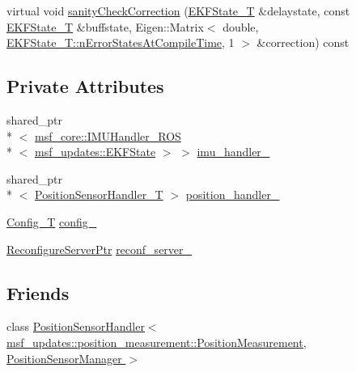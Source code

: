 \begin{DoxyCompactItemize}
\item 
virtual void \hyperlink{classmsf__position__sensor_1_1PositionSensorManager_a93258c3d736a4d38119eba66a4e7dbfa}{sanity\-Check\-Correction} (\hyperlink{classmsf__position__sensor_1_1PositionSensorManager_abf67877833d9fa2ce0afda2fd8f92bae}{E\-K\-F\-State\-\_\-\-T} \&delaystate, const \hyperlink{classmsf__position__sensor_1_1PositionSensorManager_abf67877833d9fa2ce0afda2fd8f92bae}{E\-K\-F\-State\-\_\-\-T} \&buffstate, Eigen\-::\-Matrix$<$ double, \hyperlink{structmsf__core_1_1GenericState__T_a20545d9aacd8f84bc1a97a873310cd5fab0136c5805e4e8d75677885fcaad5901}{E\-K\-F\-State\-\_\-\-T\-::n\-Error\-States\-At\-Compile\-Time}, 1 $>$ \&correction) const 
\end{DoxyCompactItemize}
\subsection*{Private Attributes}
\begin{DoxyCompactItemize}
\item 
shared\-\_\-ptr\\*
$<$ \hyperlink{classmsf__core_1_1IMUHandler__ROS}{msf\-\_\-core\-::\-I\-M\-U\-Handler\-\_\-\-R\-O\-S}\\*
$<$ \hyperlink{namespacemsf__updates_a03b0801c76b7400623b00ad4d28f9bcc}{msf\-\_\-updates\-::\-E\-K\-F\-State} $>$ $>$ \hyperlink{classmsf__position__sensor_1_1PositionSensorManager_a30614404706e5332a0b7d43b7329fa40}{imu\-\_\-handler\-\_\-}
\item 
shared\-\_\-ptr\\*
$<$ \hyperlink{classmsf__position__sensor_1_1PositionSensorManager_afd8d00f9745db7b1b5290f0613ca0eca}{Position\-Sensor\-Handler\-\_\-\-T} $>$ \hyperlink{classmsf__position__sensor_1_1PositionSensorManager_a7611c68c92ee71eef980ae0195894900}{position\-\_\-handler\-\_\-}
\item 
\hyperlink{namespacemsf__position__sensor_a888f7a67abc78bbe9b927b35f1e05933}{Config\-\_\-\-T} \hyperlink{classmsf__position__sensor_1_1PositionSensorManager_ab750ec8335fa617ce51e7e90d1f8e8ad}{config\-\_\-}
\item 
\hyperlink{namespacemsf__position__sensor_a62920eb4890a10e8224aa5ef62bb56a2}{Reconfigure\-Server\-Ptr} \hyperlink{classmsf__position__sensor_1_1PositionSensorManager_a722e3be8a48e1ac92050679569442a12}{reconf\-\_\-server\-\_\-}
\end{DoxyCompactItemize}
\subsection*{Friends}
\begin{DoxyCompactItemize}
\item 
class \hyperlink{classmsf__position__sensor_1_1PositionSensorManager_a17946aaee62098cb22d79fb7001fe003}{Position\-Sensor\-Handler$<$ msf\-\_\-updates\-::position\-\_\-measurement\-::\-Position\-Measurement, Position\-Sensor\-Manager $>$}
\end{DoxyCompactItemize}
